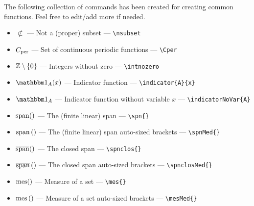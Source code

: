\documentclass[../thesis.tex]{subfiles}
\begin{document}
The following collection of commands has been created for creating common functions. Feel free to edit/add more if needed.
\begin{itemize}
    \item{$\nsubset$} — Not a (proper) subset — \verb|\nsubset|
    \item{$C_{\text{per}}$} — Set of continuous periodic functions — \verb|\Cper|
    \item{$\mathbb{Z}\setminus\{0\}$} — Integers without zero — \verb|\intnozero|
    \item{$\indicator{A}{x}$} — Indicator function — \verb|\indicator{A}{x}|
    \item{$\indicatorNoVar{A}$} — Indicator function without variable $x$ — \verb|\indicatorNoVar{A}|
    \item{$\operatorname{span}()$} — The (finite linear) span — \verb|\spn{}|
    \item{$\operatorname{span}\left(\right)$} — The (finite linear) span auto-sized brackets — \verb|\spnMed{}|
    \item {$\overline{\operatorname{span}}()$} — The closed span — \verb|\spnclos{}|
    \item {$\overline{\operatorname{span}}\left(\right)$} — The closed span auto-sized brackets — \verb|\spnclosMed{}|
    \item {$\operatorname{mes}()$} — Measure of a set — \verb|\mes{}|
    \item {$\operatorname{mes}\left(\right)$} — Measure of a set auto-sized brackets — \verb|\mesMed{}|
\end{itemize}

 
\end{document}
